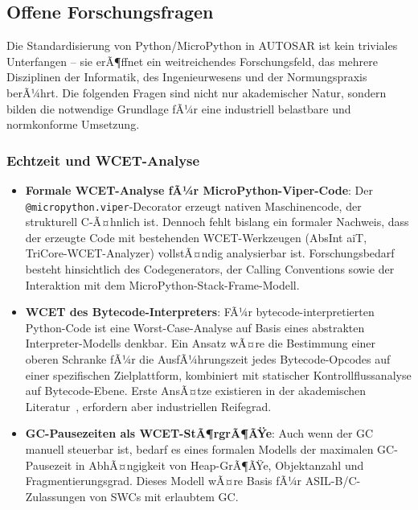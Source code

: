﻿\documentclass[12pt,a4paper,twoside]{article}
\begin{document}
\subsection{Offene Forschungsfragen}
\label{subsec:forschung}

Die Standardisierung von Python/MicroPython in AUTOSAR ist kein triviales
Unterfangen -- sie erÃ¶ffnet ein weitreichendes Forschungsfeld, das mehrere
Disziplinen der Informatik, des Ingenieurwesens und der Normungspraxis berÃ¼hrt.
Die folgenden Fragen sind nicht nur akademischer Natur, sondern bilden die
notwendige Grundlage fÃ¼r eine industriell belastbare und normkonforme Umsetzung.

\subsubsection{Echtzeit und WCET-Analyse}

\begin{itemize}
  \item \textbf{Formale WCET-Analyse fÃ¼r MicroPython-Viper-Code}:
        Der \texttt{@micropython.\newline viper}-Decorator erzeugt nativen Maschinencode,
        der strukturell C-Ã¤hnlich ist. Dennoch fehlt bislang ein formaler Nachweis,
        dass der erzeugte Code mit bestehenden WCET-Werkzeugen (AbsInt aiT,
        TriCore-WCET-Analyzer) vollstÃ¤ndig analysierbar ist.
        Forschungsbedarf besteht hinsichtlich des Codegenerators, der Calling Conventions
        sowie der Interaktion mit dem MicroPython-Stack-Frame-Modell.

  \item \textbf{WCET des Bytecode-Interpreters}:
        FÃ¼r bytecode-interpretierten Python-Code ist eine Worst-Case-Analyse
        auf Basis eines abstrakten Interpreter-Modells denkbar.
        Ein Ansatz wÃ¤re die Bestimmung einer oberen Schranke fÃ¼r die
        AusfÃ¼hrungszeit jedes Bytecode-Opcodes auf einer spezifischen Zielplattform,
        kombiniert mit statischer Kontrollfluss\-analyse auf Bytecode-Ebene.
        Erste AnsÃ¤tze existieren in der akademischen Literatur~\cite{micropython_wcet2023},
        erfordern aber industriellen Reifegrad.

  \item \textbf{GC-Pausezeiten als WCET-StÃ¶rgrÃ¶ÃŸe}:
        Auch wenn der GC manuell steuerbar ist, bedarf es eines formalen
        Modells der maximalen GC-Pausezeit in AbhÃ¤ngigkeit von Heap-GrÃ¶ÃŸe,
        Objektanzahl und Fragmentierungsgrad.
        Dieses Modell wÃ¤re Basis fÃ¼r ASIL-B/C-Zulassungen von SWCs mit
        erlaubtem GC.
\end{itemize}
\end{document}
